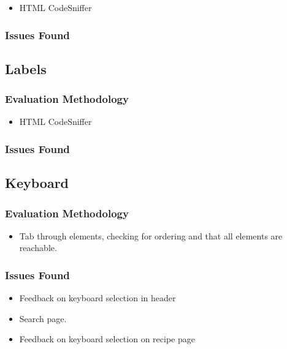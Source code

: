 \begin{itemize}
\item HTML CodeSniffer
\end{itemize}

\subsubsection{Issues Found}

\subsection{Labels}

\subsubsection{Evaluation Methodology}

\begin{itemize}
\item HTML CodeSniffer
\end{itemize}

\subsubsection{Issues Found}

\subsection{Keyboard}

\subsubsection{Evaluation Methodology}

\begin{itemize}
\item Tab through elements, checking for ordering and that all
  elements are reachable.
\end{itemize}

\subsubsection{Issues Found}

\begin{itemize}
\item Feedback on keyboard selection in header
\item Search page.
\item Feedback on keyboard selection on recipe page
\end{itemize}

